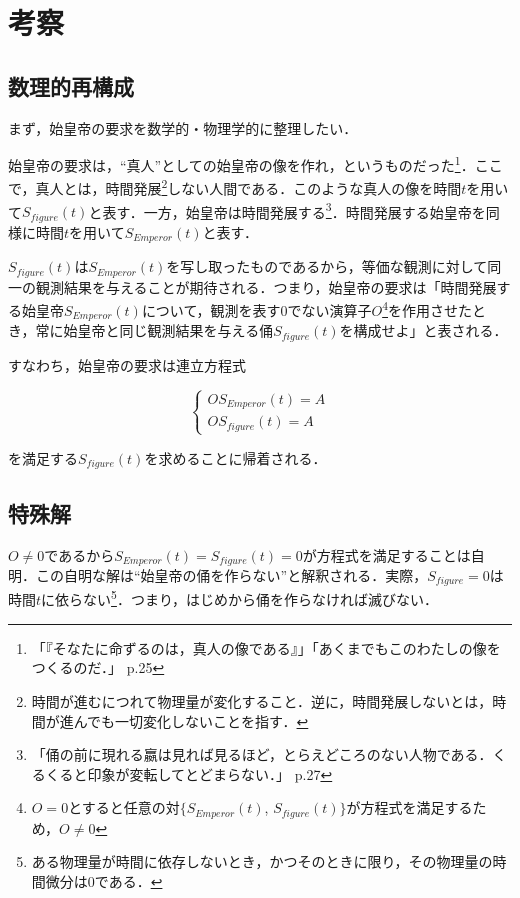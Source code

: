 \documentclass[10pt, a5paper, twoside]{jsarticle}
\theoremstyle{definition}
\begin{document}
	\section{考察}

		\subsection{数理的再構成}

		まず，始皇帝の要求を数学的・物理学的に整理したい．

		始皇帝の要求は，“真人”としての始皇帝の像を作れ，というものだった\footnote{「『そなたに命ずるのは，真人の像である』」「あくまでもこのわたしの像をつくるのだ．」\cite{mojika} p.25}．ここで，真人とは，時間発展\footnote{時間が進むにつれて物理量が変化すること．逆に，時間発展しないとは，時間が進んでも一切変化しないことを指す．}しない人間である．このような真人の像を時間$t$を用いて$ S_{figure}(t) $と表す．一方，始皇帝は時間発展する\footnote{「俑の前に現れる嬴は見れば見るほど，とらえどころのない人物である．くるくると印象が変転してとどまらない．」\cite{mojika} p.27}．時間発展する始皇帝を同様に時間$t$を用いて$ S_{Emperor}(t) $と表す．

		$S_{figure}(t)$は$S_{Emperor}(t)$を写し取ったものであるから，等価な観測に対して同一の観測結果を与えることが期待される．つまり，始皇帝の要求は「時間発展する始皇帝$ S_{Emperor}(t) $について，観測を表す0でない演算子$ O $\footnote{$ O = 0 $とすると任意の対$ \{ S_{Emperor}(t)$, $ S_{figure}(t) \} $が方程式を満足するため，$ O \neq 0 $}を作用させたとき，常に始皇帝と同じ観測結果を与える俑$ S_{figure}(t) $を構成せよ」と表される．

		すなわち，始皇帝の要求は連立方程式

		\begin{equation*}
			\begin{cases}
				O S_{Emperor}(t) = A \\ O S_{figure}(t) = A
			\end{cases}
		\end{equation*}

		を満足する$ S_{figure}(t) $を求めることに帰着される．

		\subsection{特殊解}\label{spe}

			$ O \neq 0 $であるから$ S_{Emperor}(t) = S_{figure}(t) = 0 $が方程式を満足することは自明．この自明な解は“始皇帝の俑を作らない”と解釈される．実際，$ S_{figure} = 0 $は時間$t$に依らない\footnote{ある物理量が時間に依存しないとき，かつそのときに限り，その物理量の時間微分は0である．}．つまり，はじめから俑を作らなければ滅びない．
\end{document}
